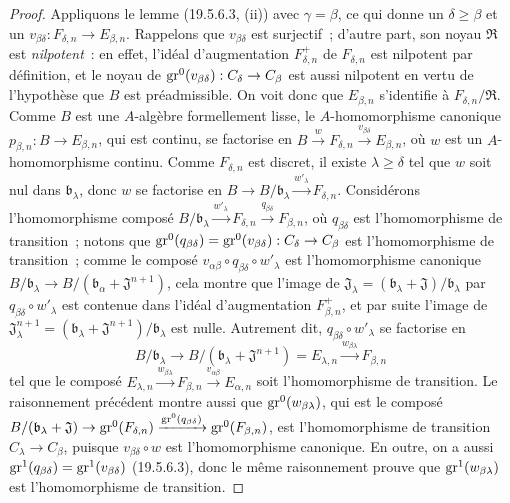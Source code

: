 \begin{proof}
Appliquons le lemme (19.5.6.3, (ii)) avec $\gamma=\beta$, ce qui donne un
$\delta\geq\beta$ et un
$v_{\beta\delta}:F_{\delta,n}\to E_{\beta,n}$. Rappelons que
$v_{\beta\delta}$ est surjectif~; d'autre part, son noyau $\mathfrak R$ est
\emph{nilpotent}~: en effet, l'idéal d'augmentation $F_{\delta,n}^+$ de
$F_{\delta,n}$ est nilpotent par définition, et le noyau de
$\operatorname{gr}^0(v_{\beta\delta}):C_\delta\to C_\beta$ est aussi nilpotent en vertu de
l'hypothèse que $B$ est préadmissible. On voit donc que $E_{\beta,n}$
s'identifie à $F_{\delta,n}/\mathfrak R$. Comme $B$ est une $A$-algèbre
formellement lisse, le $A$-homomorphisme canonique
$p_{\beta,n}:B\to E_{\beta,n}$, qui est continu, se factorise en
$B\xrightarrow{w}F_{\delta,n}\xrightarrow{v_{\beta\delta}}E_{\beta,n}$, où
$w$ est un $A$-homomorphisme continu. Comme $F_{\delta,n}$ est discret, il
existe $\lambda\geq\delta$ tel que $w$ soit nul dans $\mathfrak b_\lambda$,
donc $w$ se factorise en
$B\to B/\mathfrak b_\lambda\xrightarrow{w'_\lambda}F_{\delta,n}$. Considérons
l'homomorphisme composé
$B/\mathfrak b_\lambda\xrightarrow{w'_\lambda}F_{\delta,n}
\xrightarrow{q_{\beta\delta}}F_{\beta,n}$, où $q_{\beta\delta}$ est
l'homomorphisme de transition~; notons que
$\operatorname{gr}^0(q_{\beta\delta})=\operatorname{gr}^0(v_{\beta\delta}):C_\delta\to C_\beta$ est
l'homomorphisme de transition~; comme le composé
$v_{\alpha\beta}\circ q_{\beta\delta}\circ w'_\lambda$ est l'homomorphisme
canonique $B/\mathfrak b_\lambda\to
B/(\mathfrak b_\alpha+\mathfrak J^{n+1})$, cela montre que l'image de
$\mathfrak J_\lambda=(\mathfrak b_\lambda+\mathfrak J)/\mathfrak b_\lambda$
par $q_{\beta\delta}\circ w'_\lambda$ est contenue dans l'idéal d'augmentation
$F_{\beta,n}^+$, et par suite l'image de
$\mathfrak J_\lambda^{n+1}=(\mathfrak b_\lambda+\mathfrak J^{n+1})/
\mathfrak b_\lambda$ est nulle. Autrement dit,
$q_{\beta\delta}\circ w'_\lambda$ se factorise en
\[
  B/\mathfrak b_\lambda\to
  B/(\mathfrak b_\lambda+\mathfrak J^{n+1})=E_{\lambda,n}
  \xrightarrow{w_{\beta\lambda}}F_{\beta,n}
\]
tel que le composé
$E_{\lambda,n}\xrightarrow{w_{\beta\lambda}}F_{\beta,n}
\xrightarrow{v_{\alpha\beta}}E_{\alpha,n}$ soit l'homomorphisme de transition.
Le raisonnement précédent montre aussi que $\operatorname{gr}^0(w_{\beta\lambda})$, qui est
le composé
$B/(\mathfrak b_\lambda+\mathfrak J)\to\operatorname{gr}^0(F_{\delta,n})
\xrightarrow{\operatorname{gr}^0(q_{\beta\delta})}\operatorname{gr}^0(F_{\beta,n})$, est l'homomorphisme
de transition $C_\lambda\to C_\beta$, puisque
$v_{\beta\delta}\circ w$ est l'homomorphisme canonique. En outre, on a aussi
$\operatorname{gr}^1(q_{\beta\delta})=\operatorname{gr}^1(v_{\beta\delta})$ (19.5.6.3), donc le même
raisonnement prouve que $\operatorname{gr}^1(w_{\beta\lambda})$ est l'homomorphisme de
transition.
\end{proof}

